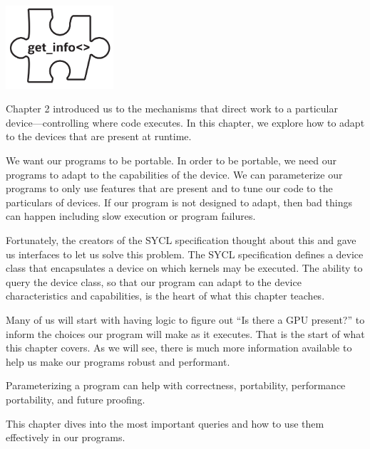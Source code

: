 \begin{center}
	\includegraphics[width=0.3\textwidth]{content/chapter-12/images/1}
\end{center}

Chapter 2 introduced us to the mechanisms that direct work to a particular device—controlling where code executes. In this chapter, we explore how to adapt to the devices that are present at runtime.\par

We want our programs to be portable. In order to be portable, we need our programs to adapt to the capabilities of the device. We can parameterize our programs to only use features that are present and to tune our code to the particulars of devices. If our program is not designed to adapt, then bad things can happen including slow execution or program failures.\par

Fortunately, the creators of the SYCL specification thought about this and gave us interfaces to let us solve this problem. The SYCL specification defines a device class that encapsulates a device on which kernels may be executed. The ability to query the device class, so that our program can adapt to the device characteristics and capabilities, is the heart of what this chapter teaches.\par

Many of us will start with having logic to figure out “Is there a GPU present?” to inform the choices our program will make as it executes. That is the start of what this chapter covers. As we will see, there is much more information available to help us make our programs robust and performant.\par

\begin{tcolorbox}[colback=red!5!white,colframe=red!75!black]
Parameterizing a program can help with correctness, portability, performance portability, and future proofing.
\end{tcolorbox}

This chapter dives into the most important queries and how to use them effectively in our programs.\par

